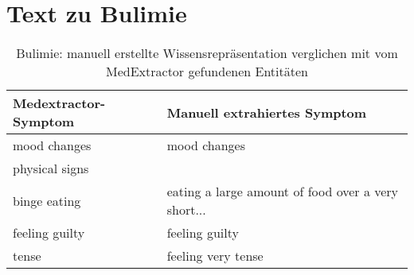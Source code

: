 \section{Text zu Bulimie}
\label{sec:bulimia} 

\begin{table}[H]
\begin{center}
\begin{tabular}{ll}
\toprule
  Medextractor-Symptom &                       Manuell extrahiertes Symptom \\
\midrule
        mood changes &                                       mood changes \\
      physical signs &                                                    \\
        binge eating & eating a large amount of food over a very short... \\
      feeling guilty &                                     feeling guilty \\
               tense &                                 feeling very tense \\
\bottomrule
\end{tabular}
\caption{Bulimie: manuell erstellte Wissensrepräsentation verglichen mit vom MedExtractor gefundenen Entitäten}
\label{tab:bulimia_vergleich_manuell_medextractor}
\end{center}
\end{table}


